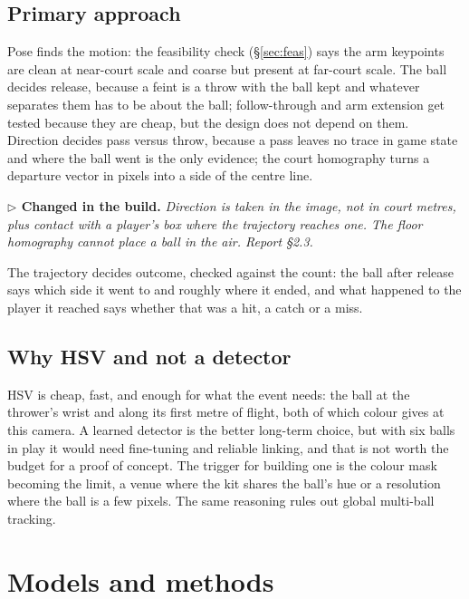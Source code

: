 \documentclass[10pt,a4paper]{article}
\newcommand{\changed}[1]{%
  \par\smallskip\noindent
  {\color{accent!88!black}\small\textbf{$\triangleright$ Changed in the build.} \textit{#1}}\par\smallskip}
\begin{document}
\subsection{Primary approach}

Pose finds the motion: the feasibility check (\S\ref{sec:feas}) says the arm keypoints are
clean at near-court scale and coarse but present at far-court scale. The ball decides
release, because a feint is a throw with the ball kept and whatever separates them has to be
about the ball; follow-through and arm extension get tested because they are cheap, but the
design does not depend on them. Direction decides pass versus throw, because a pass leaves no
trace in game state and where the ball went is the only evidence; the court homography turns a
departure vector in pixels into a side of the centre line.

\changed{Direction is taken in the image, not in court metres, plus contact with a player's
box where the trajectory reaches one. The floor homography cannot place a ball in the air.
Report \S2.3.}

The trajectory decides outcome, checked against the count: the ball after release says
which side it went to and roughly where it ended, and what happened to the player it reached
says whether that was a hit, a catch or a miss.

\subsection{Why HSV and not a detector}

HSV is cheap, fast, and enough for what the event needs: the ball at the thrower's wrist
and along its first metre of flight, both of which colour gives at this camera. A learned
detector is the better long-term choice, but with six balls in play it would need
fine-tuning and reliable linking, and that is not worth the budget for a proof of concept.
The trigger for building one is the colour mask becoming the limit, a venue where the kit
shares the ball's hue or a resolution where the ball is a few pixels. The same reasoning
rules out global multi-ball tracking.

\section{Models and methods}
\end{document}

